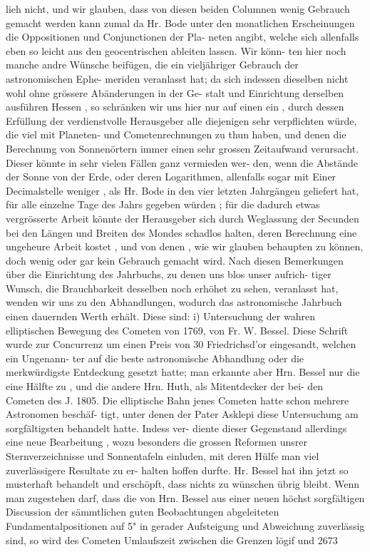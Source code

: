 \documentclass[12pt,a4paper]{article}
\begin{document}
lieh  nicht,  und  wir  glauben,  dass  von  diesen  beiden  Columnen  wenig  Gebrauch  gemacht  werden  kann zumal  da  Hr.  Bode  unter  den  monatlichen  Erscheinungen  die  Oppositionen  und  Conjunctionen  der  Pla- neten angibt,  welche  sich  allenfalls  eben  so  leicht  aus  den  geocentrischen  ableiten  lassen.  Wir  könn- ten hier  noch  manche  andre  Wünsche  beifügen,  die  ein  vieljähriger  Gebrauch  der  astronomischen  Ephe- meriden  veranlasst  hat;  da  sich  indessen  dieselben  nicht  wohl  ohne  grössere  Abänderungen  in  der  Ge- stalt und  Einrichtung  derselben  ausführen  Hessen ,  so  schränken  wir  uns  hier  nur  auf  einen  ein ,  durch dessen  Erfüllung  der  verdienstvolle  Herausgeber  alle  diejenigen  sehr  verpflichten  würde,  die  viel  mit Planeten-  und  Cometenrechnungen  zu  thun  haben,  und  denen  die  Berechnung  von  Sonnenörtern  immer einen  sehr  grossen  Zeitaufwand  verursacht.  Dieser  könnte  in  sehr  vielen  Fällen  ganz  vermieden  wer- den, wenn  die  Abstände  der  Sonne  von  der  Erde,  oder  deren  Logarithmen,  allenfalls  sogar  mit  Einer Decimalstelle  weniger ,  als  Hr.  Bode  in  den  vier  letzten  Jahrgängen  geliefert  hat,  für  alle  einzelne  Tage des  Jahrs  gegeben  würden ;  für  die  dadurch  etwas  vergrösserte  Arbeit  könnte  der  Herausgeber  sich  durch Weglassung  der  Secunden  bei  den  Längen  und  Breiten  des  Mondes  schadlos  halten,  deren  Berechnung eine  ungeheure  Arbeit  kostet ,  und  von  denen ,  wie  wir  glauben  behaupten  zu  können,  doch  wenig  oder gar  kein  Gebrauch  gemacht  wird. Nach  diesen  Bemerkungen  über  die  Einrichtung  des  Jahrbuchs,  zu  denen  uns  blos  unser  aufrich- tiger Wunsch,  die  Brauchbarkeit  desselben  noch  erhöhet  zu  sehen,  veranlasst  hat,  wenden  wir  uns  zu den  Abhandlungen,  wodurch  das  astronomische  Jahrbuch  einen  dauernden  Werth  erhält.  Diese  sind: i)  Untersuchung  der  wahren  elliptischen  Bewegung  des  Cometen  von  1769,  von  Fr.  W.  Bessel.  Diese Schrift  wurde  zur  Concurrenz  um  einen  Preis  von  30  Friedrichsd'or  eingesandt,  welchen  ein  Ungenann- ter auf  die  beste  astronomische  Abhandlung  oder  die  merkwürdigste  Entdeckung  gesetzt  hatte;  man erkannte  aber  Hrn.  Bessel  nur  die  eine  Hälfte  zu ,  und  die  andere  Hrn.  Huth,  als  Mitentdecker  der  bei- den Cometen  des  J.  1805.  Die  elliptische  Bahn  jenes  Cometen  hatte  schon  mehrere  Astronomen  beschäf- tigt, unter  denen  der  Pater  Asklepi  diese  Untersuchung  am  sorgfältigsten  behandelt  hatte.  Indess  ver- diente dieser  Gegenstand  allerdings  eine  neue  Bearbeitung ,  wozu  besonders  die  grossen  Reformen  unsrer Sternverzeichnisse  und  Sonnentafeln  einluden,  mit  deren  Hülfe  man  viel  zuverlässigere  Resultate  zu  er- halten hoffen  durfte.  Hr.  Bessel  hat  ihn  jetzt  so  musterhaft  behandelt  und  erschöpft,  dass  nichts  zu wünschen  übrig  bleibt.  Wenn  man  zugestehen  darf,  dass  die  von  Hrn.  Bessel  aus  einer  neuen  höchst sorgfältigen  Discussion  der  sämmtlichen  guten  Beobachtungen  abgeleiteten  Fundamentalpositionen  auf 5"  in  gerader  Aufsteigung  und  Abweichung  zuverlässig  sind,  so  wird  des  Cometen  Umlaufszeit  zwischen die  Grenzen  lögif  und  2673  
\end{document}
